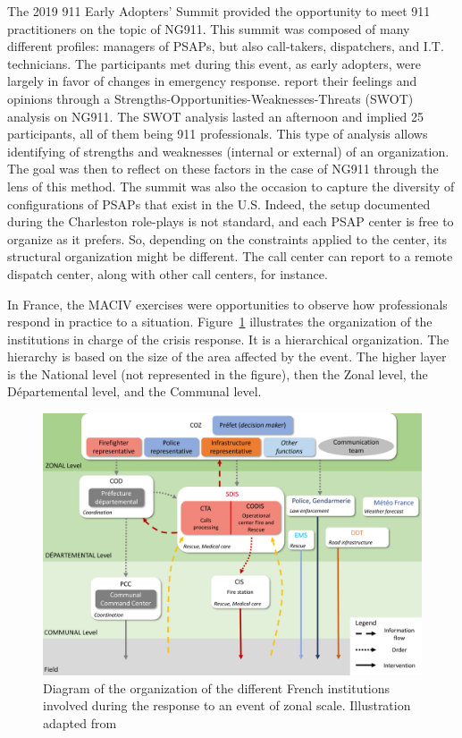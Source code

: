 The 2019 911 Early Adopters' Summit provided the opportunity to meet 911 practitioners on the topic of NG911.
This summit was composed of many different profiles: managers of PSAPs, but also call-takers, dispatchers, and I.T. technicians.
The participants met during this event, as early adopters, were largely in favor of changes in emergency response.
\textcite{graceCommunicatingNextGeneration9112020} report their feelings and opinions through a Strengths-Opportunities-Weaknesses-Threats (SWOT) analysis \parencite{gaoConsolidatingSWOTAnalysis2011} on NG911.
The SWOT analysis lasted an afternoon and implied 25 participants, all of them being 911 professionals.
This type of analysis allows identifying of strengths and weaknesses (internal or external) of an organization.
The goal was then to reflect on these factors in the case of NG911 through the lens of this method.
The summit was also the occasion to capture the diversity of configurations of PSAPs that exist in the U.S.
Indeed, the setup documented during the Charleston role-plays is not standard, and each PSAP center is free to organize as it prefers.
So, depending on the constraints applied to the center, its structural organization might be different.
The call center can report to a remote dispatch center, along with other call centers, for instance.

In France, the MACIV exercises were opportunities to observe how professionals respond in practice to a situation.
Figure~\ref{information:french-orga} illustrates the organization of the institutions in charge of the crisis response.
It is a hierarchical organization.
The hierarchy is based on the size of the area affected by the event.
The higher layer is the National level (not represented in the figure), then the Zonal level, the Départemental level, and the Communal level.

\begin{figure}[thb]
    \centering
    \includegraphics[width=\textwidth]{figures/chap-3/orga-gestion-crise.pdf}
    \caption{Diagram of the organization of the different French institutions involved during the response to an event of zonal scale. Illustration adapted from \textcite{batardIntegrerContributionsCitoyennes2021}}
    \label{information:french-orga}
\end{figure}

